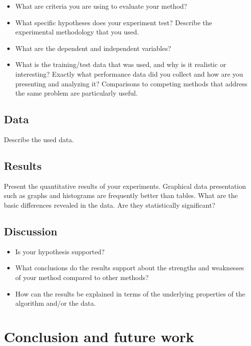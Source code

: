 \documentclass[runningheads,a4paper,11pt]{report}
\begin{document}
\begin{itemize}
	\item What are criteria you are using to evaluate your method? 
	\item What specific hypotheses does your experiment test? Describe the experimental methodology that you used. 
	\item What are the dependent and independent variables? 
	\item What is the training/test data that was used, and why is it realistic or interesting? Exactly what performance data did you collect and how are you presenting and analyzing it? Comparisons to competing methods that address the same problem are particularly useful.
\end{itemize}

\section{Data}
\label{section:data}

Describe the used data.

\section{Results}
\label{section:results}

Present the quantitative results of your experiments. Graphical data presentation such as graphs and histograms are frequently better than tables. What are the basic differences revealed in the data. Are they statistically significant?

\section{Discussion}
\label{section:discussion}

\begin{itemize}
	\item Is your hypothesis supported? 
	\item What conclusions do the results support about the strengths and weaknesses of your method compared to other methods? 
	\item How can the results be explained in terms of the underlying properties of the algorithm and/or the data. 
\end{itemize}



\chapter{Conclusion and future work}
\label{chapter:concl}
\end{document}
